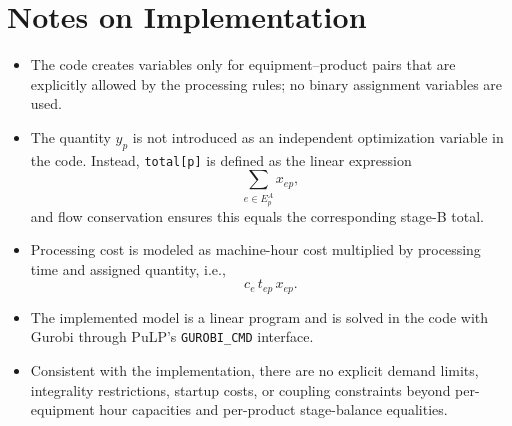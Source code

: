 \section*{Notes on Implementation}

\begin{itemize}
    \item The code creates variables only for equipment--product pairs that are explicitly allowed by the processing rules; no binary assignment variables are used.
    \item The quantity $y_p$ is not introduced as an independent optimization variable in the code. Instead, \texttt{total[p]} is defined as the linear expression
    \[
    \sum_{e\in E^A_p} x_{ep},
    \]
    and flow conservation ensures this equals the corresponding stage-B total.
    \item Processing cost is modeled as machine-hour cost multiplied by processing time and assigned quantity, i.e.,
    \[
    c_e\, t_{ep}\, x_{ep}.
    \]
    \item The implemented model is a linear program and is solved in the code with Gurobi through PuLP's \texttt{GUROBI\_CMD} interface.
    \item Consistent with the implementation, there are no explicit demand limits, integrality restrictions, startup costs, or coupling constraints beyond per-equipment hour capacities and per-product stage-balance equalities.
\end{itemize}
